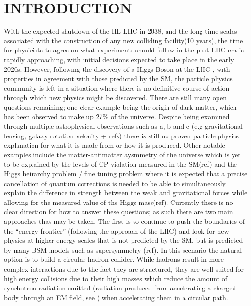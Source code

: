 \chapter{INTRODUCTION}

With the expected shutdown of the \ac{HL-LHC} in 2038, and the long time scales associated with the construction of any new colliding facility(\~10 years), the time for physicists to agree on what experiments should follow in the post-\ac{LHC} era is rapidly approaching, with initial decisions expected to take place in the early 2020s. However, following the discovery of a Higgs Boson at the \ac{LHC} \cite{:2012gk,Chatrchyan:2012xdj}, with properties in agreement with those predicted by the \ac{SM}, the particle physics community is left in a situation where there is no definitive course of action through which new physics might be discovered. There are still many open questions remaining; one clear example being the origin of dark matter, which has been observed to make up \~27\% of the universe. Despite being examined through multiple astrophysical observations such as a, b and c (e.g gravitational lensing, galaxy rotation velocity + refs) there is still no proven particle physics explanation for what it is made from or how it is produced. Other notable examples include the matter-antimatter aysmmetry of the universe which is yet to be explained by the levels of CP violation measured in the \ac{SM}(ref) and the Higgs heirarchy problem / fine tuning problem where it is expected that a precise cancellation of quantum corrections is needed to be able to simultaneously explain the difference in strength between the weak and gravitational forces while allowing for the measured value of the Higgs mass(ref). Currently there is no clear direction for how to answer these questions; as such there are two main approaches that may be taken. The first is to continue to push the boundaries of the ``energy frontier'' (following the approach of the \ac{LHC}) and look for new physics at higher energy scales that is not predicted by the \ac{SM}, but is predicted by many \ac{BSM} models such as supersymmetry (ref). In this scenario the natural option is to build a circular hadron collider. While hadrons result in more complex interactions due to the fact they are structured, they are well suited for high energy collisions due to their high masses which reduce the amount of synchotron radiation emitted (radiation produced from accelerating a charged body through an \ac{EM} field, see ) when accelerating them in a circular path.

